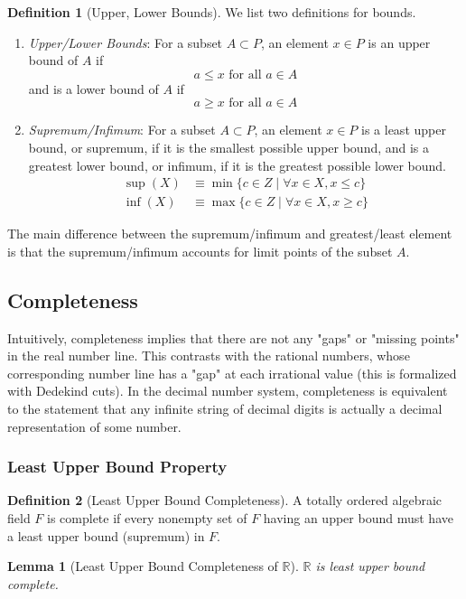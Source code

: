 \documentclass{article}
\newtheorem{lemma}[theorem]{Lemma}
\theoremstyle{remark}
\theoremstyle{definition}
\newtheorem{definition}{Definition}[section]
\begin{document}
\begin{definition}[Upper, Lower Bounds]
We list two definitions for bounds. 
\begin{enumerate}
    \item \textit{Upper/Lower Bounds}: For a subset $A \subset P$, an element $x \in P$ is an upper bound of $A$ if 
    \[a \leq x \text{ for all } a \in A\]
    and is a lower bound of $A$ if
    \[a \geq x \text{ for all } a \in A\]
    \item \textit{Supremum/Infimum}: For a subset $A \subset P$, an element $x \in P$ is a least upper bound, or supremum, if it is the smallest possible upper bound, and is a greatest lower bound, or infimum, if it is the greatest possible lower bound. 
    \begin{align*}
        \sup(X) &\equiv \min{\{c\in Z\;|\; \forall x \in X, x \leq c\}} \\
        \inf(X) &\equiv \max{\{c\in Z\;|\; \forall x \in X, x \geq c\}}
    \end{align*}
\end{enumerate}
The main difference between the supremum/infimum and greatest/least element is that the supremum/infimum accounts for limit points of the subset $A$. 
\end{definition}

\subsection{Completeness}
Intuitively, completeness implies that there are not any "gaps" or "missing points" in the real number line. This contrasts with the rational numbers, whose corresponding number line has a "gap" at each irrational value (this is formalized with Dedekind cuts). In the decimal number system, completeness is equivalent to the statement that any infinite string of decimal digits is actually a decimal representation of some number. 

\subsubsection{Least Upper Bound Property}
\begin{definition}[Least Upper Bound Completeness]
A totally ordered algebraic field $F$ is complete if every nonempty set of $F$ having an upper bound must have a least upper bound (supremum) in $F$. 
\end{definition}

\begin{lemma}[Least Upper Bound Completeness of $\mathbb{R}$]
$\mathbb{R}$ is least upper bound complete. 
\end{lemma}
\end{document}
